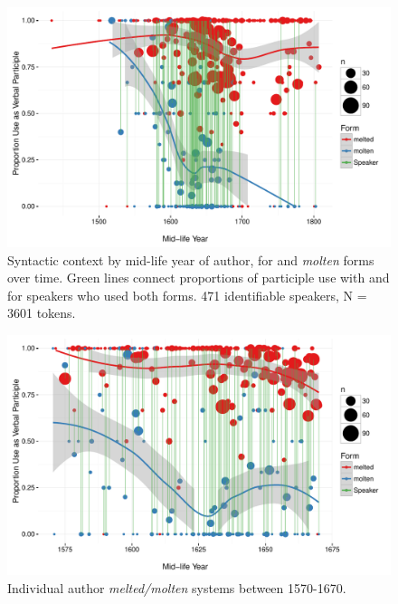 \documentclass{artikel3}
\begin{document}
\begin{figure}
    \begin{center}
    \includegraphics[scale=.6]{ContextByDateAuthor.pdf}
    \caption{Syntactic context by mid-life year of author, for  and \textsl{molten} forms over time. Green lines connect proportions of participle use with  and  for speakers who used both forms. 471 identifiable speakers, N = 3601 tokens.}
       \label{molten3}
    \end{center}
\end{figure}

\begin{figure}
    \begin{center}
    \includegraphics[scale=.6]{ContextByDateAuthor1570.pdf}
    \caption{Individual author \textsl{melted/molten} systems between 1570-1670.}
       \label{molten4}
    \end{center}
\end{figure}
\end{document}
